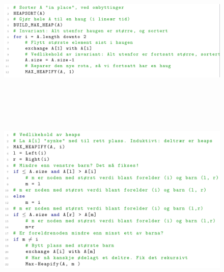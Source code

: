 \documentclass[12pt]{report}
\begin{document}

\begin{figure}[H]
	\begin{Center}
		\includegraphics[width=6.3in,height=2.14in]{./media/image170.png}
	\end{Center}
\end{figure}



\par


\vspace{\baselineskip}



\begin{figure}[H]
	\begin{Center}
		\includegraphics[width=6.3in,height=3.99in]{./media/image171.png}
	\end{Center}
\end{figure}
\end{document}
